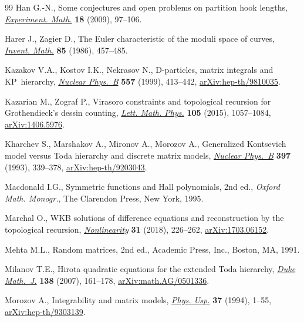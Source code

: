 \documentclass[pdftex]{sigma}
\numberwithin{equation}{section}
\begin{document}
\begin{thebibliography}{99}
Han G.-N., Some conjectures and open problems on partition hook lengths,
 \href{https://doi.org/10.1080/10586458.2009.10128888}{\textit{Experiment.
 Math.}} \textbf{18} (2009), 97--106.

Harer J., Zagier D., The {E}uler characteristic of the moduli space of curves,
 \href{https://doi.org/10.1007/BF01390325}{\textit{Invent. Math.}} \textbf{85}
 (1986), 457--485.

Kazakov V.A., Kostov I.K., Nekrasov N., D-particles, matrix integrals and
 {KP}~hierarchy,
 \href{https://doi.org/10.1016/S0550-3213(99)00393-4}{\textit{Nuclear
 Phys.~B}} \textbf{557} (1999), 413--442,
 \href{http://arxiv.org/abs/hep-th/9810035}{arXiv:hep-th/9810035}.

Kazarian M., Zograf P., Virasoro constraints and topological recursion for
 {G}rothendieck's dessin counting,
 \href{https://doi.org/10.1007/s11005-015-0771-0}{\textit{Lett. Math. Phys.}}
 \textbf{105} (2015), 1057--1084,
 \href{http://arxiv.org/abs/1406.5976}{arXiv:1406.5976}.

Kharchev S., Marshakov A., Mironov A., Morozov A., Generalized {K}ontsevich
 model versus {T}oda hierarchy and discrete matrix models,
 \href{https://doi.org/10.1016/0550-3213(93)90347-R}{\textit{Nuclear Phys.~B}}
 \textbf{397} (1993), 339--378,
 \href{http://arxiv.org/abs/hep-th/9203043}{arXiv:hep-th/9203043}.

Macdonald I.G., Symmetric functions and {H}all polynomials, 2nd ed., \textit{Oxford Math. Monogr.}, The Clarendon Press, New York, 1995.

Marchal O., W{KB} solutions of difference equations and reconstruction by the
 topological recursion,
 \href{https://doi.org/10.1088/1361-6544/aa92ed}{\textit{Nonlinearity}}
 \textbf{31} (2018), 226--262,
 \href{http://arxiv.org/abs/1703.06152}{arXiv:1703.06152}.

Mehta M.L., Random matrices, 2nd ed., Academic Press, Inc., Boston, MA, 1991.

Milanov T.E., Hirota quadratic equations for the extended {T}oda hierarchy,
 \href{https://doi.org/10.1215/S0012-7094-07-13815-8}{\textit{Duke Math.~J.}}
 \textbf{138} (2007), 161--178,
 \href{http://arxiv.org/abs/math.AG/0501336}{arXiv:math.AG/0501336}.

Morozov A., Integrability and matrix models,
 \href{https://doi.org/10.1070/PU1994v037n01ABEH000001}{\textit{Phys. Usp.}}
 \textbf{37} (1994), 1--55,
 \href{http://arxiv.org/abs/hep-th/9303139}{arXiv:hep-th/9303139}.


\end{thebibliography}
\end{document}
